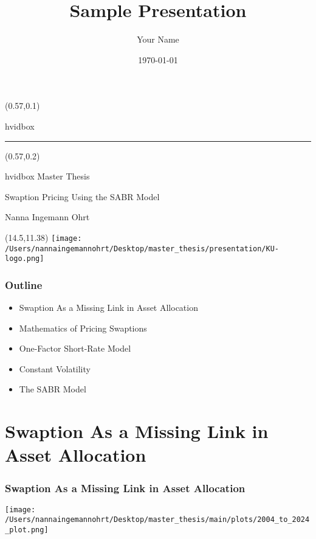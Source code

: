 \documentclass{beamer}
\title{Sample Presentation}
\author{Your Name}
\date{\today}
\begin{document}
{
\begin{frame}[plain] 
    \begin{textblock*}{\textwidth}(0.57\textwidth,0.1\textheight)
        \begin{beamercolorbox}[wd=7.8cm,ht=7.3cm,sep=0.5cm]{hvidbox}
            \fontsize{5}{10}\selectfont {}
            \noindent\textcolor{KUrod}{\rule{6.8cm}{0.4pt}}
        \end{beamercolorbox}
    \end{textblock*}
    \begin{textblock*}{\textwidth}(0.57\textwidth,0.2\textheight) 
        \begin{beamercolorbox}[wd=7.8cm,sep=0.5cm]{hvidbox}
                \Huge \textcolor{KUrod}{Master Thesis}
                \vspace{0.5cm}
                \par
                \Large Swaption Pricing Using the SABR Model
                \vspace{0.5cm}
                \par
                \normalsize Nanna Ingemann Ohrt
        \end{beamercolorbox}
    \end{textblock*}
    \begin{textblock}{1}(14.5,11.38)
        \texttt{[image: /Users/nannaingemannohrt/Desktop/master\_thesis/presentation/KU-logo.png]}
    \end{textblock}
\end{frame}
}

\begin{frame}
    \frametitle{{\textcolor{KUrod}{Outline}}}
    \begin{itemize}[label=\textcolor{KUrod}{\textbullet}]
        \item Swaption As a Missing Link in Asset Allocation
        \item Mathematics of Pricing Swaptions
        \item One-Factor Short-Rate Model
        \item Constant Volatility
        \item The SABR Model
    \end{itemize}
\end{frame}
    

\section{Swaption As a Missing Link in Asset Allocation}
\begin{frame}
    \frametitle{\textcolor{KUrod}{Swaption As a Missing Link in Asset Allocation}}
    \begin{center}
        \texttt{[image: /Users/nannaingemannohrt/Desktop/master\_thesis/main/plots/2004\_to\_2024\_plot.png]}
    \end{center}
\end{frame}
\end{document}
